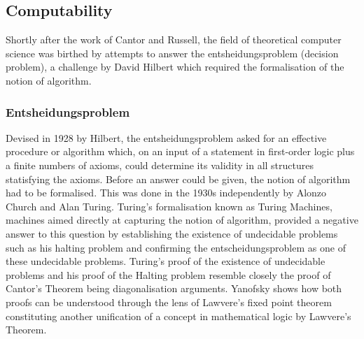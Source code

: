 
\subsection{Computability}
Shortly after the work of Cantor and Russell, the field of theoretical computer
science was birthed by attempts to answer the entsheidungsproblem (decision
problem), a challenge by David Hilbert \cite{hilbert1928theoretische} which required the formalisation of the
notion of algorithm.

\subsubsection{Entsheidungsproblem}

Devised in 1928 by Hilbert, the entsheidungsproblem asked for an effective
procedure or algorithm which, on an input of a statement in first-order logic
plus a finite numbers of axioms, could determine its validity in all structures
statisfying the axioms. Before an answer could be given, the notion of algorithm
had to be formalised. This was done in the 1930s independently by Alonzo Church
and Alan Turing. Turing's formalisation
\cite{turing1937computable} known as Turing Machines, machines aimed directly at
capturing the notion of algorithm, provided a negative answer to this question
by establishing the existence of undecidable problems such as his halting
problem and confirming the entscheidungsproblem as one of these undecidable
problems.  Turing's proof of the existence of undecidable problems and his proof
of the Halting problem resemble closely the proof of Cantor's Theorem being
diagonalisation arguments. Yanofsky shows how both proofs can be understood
through the lens of Lawvere's fixed point theorem constituting another
unification of a concept in mathematical logic by Lawvere's Theorem.
